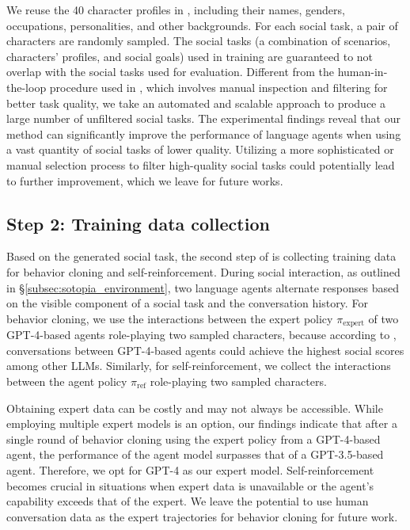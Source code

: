 We reuse the 40 character profiles in \sotopia, including their names, genders, occupations, personalities, and other backgrounds. For each social task, a pair of characters are randomly sampled.
The social tasks (a combination of scenarios, characters' profiles, and social goals) used in training are guaranteed to not overlap with the social tasks used for evaluation. 
Different from the human-in-the-loop procedure used in \sotopia, which involves manual inspection and filtering for better task quality, we take an automated and scalable approach to produce a large number of unfiltered social tasks. The experimental findings reveal that our method can significantly improve the performance of language agents when using a vast quantity of social tasks of lower quality. Utilizing a more sophisticated or manual selection process to filter high-quality social tasks could potentially lead to further improvement, which we leave for future works. 
\subsection*{Step 2: Training data collection}
\label{sec:method_collecting_social_interaction_data}
Based on the generated social task, the second step of \model is collecting training data for behavior cloning and self-reinforcement. During social interaction, as outlined in \S\ref{subsec:sotopia_environment}, two language agents alternate responses based on the visible component of a social task and the conversation history. 
For behavior cloning, we use the interactions between the expert policy $\pi_{\text{expert}}$ of two GPT-4-based agents role-playing two sampled characters, because according to \citep{sotopia}, conversations between GPT-4-based agents could achieve the highest social scores among other LLMs. 
Similarly, for self-reinforcement, we collect the interactions between the agent policy $\pi_{\text{ref}}$ role-playing two sampled characters. 

Obtaining expert data can be costly and may not always be accessible. While employing multiple expert models is an option, our findings indicate that after a single round of behavior cloning using the expert policy from a GPT-4-based agent, the performance of the agent model surpasses that of a GPT-3.5-based agent. Therefore, we opt for GPT-4 as our expert model. Self-reinforcement becomes crucial in situations when expert data is unavailable or the agent's capability exceeds that of the expert. We leave the potential to use human conversation data as the expert trajectories for behavior cloning for future work.

